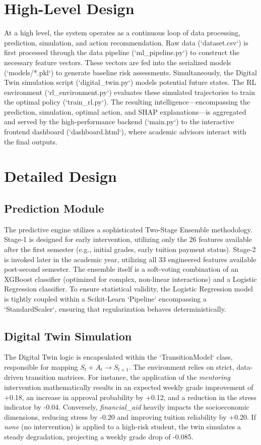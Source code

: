 \documentclass[12pt,a4paper]{report}
\begin{document}
\section{High-Level Design}
At a high level, the system operates as a continuous loop of data processing, prediction, simulation, and action recommendation. Raw data (`dataset.csv`) is first processed through the data pipeline (`ml_pipeline.py`) to construct the necessary feature vectors. These vectors are fed into the serialized models (`models/*.pkl`) to generate baseline risk assessments. Simultaneously, the Digital Twin simulation script (`digital_twin.py`) models potential future states. The RL environment (`rl_environment.py`) evaluates these simulated trajectories to train the optimal policy (`train_rl.py`). The resulting intelligence—encompassing the prediction, simulation, optimal action, and SHAP explanations—is aggregated and served by the high-performance backend (`main.py`) to the interactive frontend dashboard (`dashboard.html`), where academic advisors interact with the final outputs.

\section{Detailed Design}
\subsection{Prediction Module}
The predictive engine utilizes a sophisticated Two-Stage Ensemble methodology. Stage-1 is designed for early intervention, utilizing only the 26 features available after the first semester (e.g., initial grades, early tuition payment status). Stage-2 is invoked later in the academic year, utilizing all 33 engineered features available post-second semester. The ensemble itself is a soft-voting combination of an XGBoost classifier (optimized for complex, non-linear interactions) and a Logistic Regression classifier. To ensure statistical validity, the Logistic Regression model is tightly coupled within a Scikit-Learn `Pipeline` encompassing a `StandardScaler`, ensuring that regularization behaves deterministically. 

\subsection{Digital Twin Simulation}
The Digital Twin logic is encapsulated within the `TransitionModel` class, responsible for mapping $S_t + A_t \rightarrow S_{t+1}$. The environment relies on strict, data-driven transition matrices. For instance, the application of the \textit{mentoring} intervention mathematically results in an expected weekly grade improvement of +0.18, an increase in approval probability by +0.12, and a reduction in the stress indicator by -0.04. Conversely, \textit{financial\_aid} heavily impacts the socioeconomic dimensions, reducing stress by -0.20 and improving tuition reliability by +0.20. If \textit{none} (no intervention) is applied to a high-risk student, the twin simulates a steady degradation, projecting a weekly grade drop of -0.085.
\end{document}

